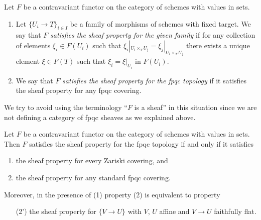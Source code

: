 \begin{definition}
\label{definition-sheaf-property-fpqc}
Let $F$ be a contravariant functor on the category
of schemes with values in sets.
\begin{enumerate}
\item Let $\{U_i \to T\}_{i \in I}$ be a family of morphisms
of schemes with fixed target.
We say that $F$ {\it satisfies the sheaf property for the given family}
if for any collection of elements $\xi_i \in F(U_i)$ such that
$\xi_i|_{U_i \times_T U_j} = \xi_j|_{U_i \times_T U_j}$
there exists a unique element
$\xi \in F(T)$ such that $\xi_i = \xi|_{U_i}$ in $F(U_i)$.
\item We say that $F$ {\it satisfies the sheaf property for the
fpqc topology} if it satisfies the sheaf property for any
fpqc covering.
\end{enumerate}
\end{definition}

\noindent
We try to avoid using the terminology ``$F$ is a sheaf'' in this
situation since we are not defining a category of fpqc sheaves
as we explained above.

\begin{lemma}
\label{lemma-sheaf-property-fpqc}
Let $F$ be a contravariant functor on the category
of schemes with values in sets. Then $F$ satisfies
the sheaf property for the fpqc topology if and only
if it satisfies
\begin{enumerate}
\item the sheaf property for every Zariski covering, and
\item the sheaf property for any standard fpqc covering.
\end{enumerate}
Moreover, in the presence of (1) property (2) is equivalent to
property
\begin{enumerate}
\item[(2')] the sheaf property for $\{V \to U\}$
with $V$, $U$ affine and $V \to U$ faithfully flat.
\end{enumerate}
\end{lemma}

